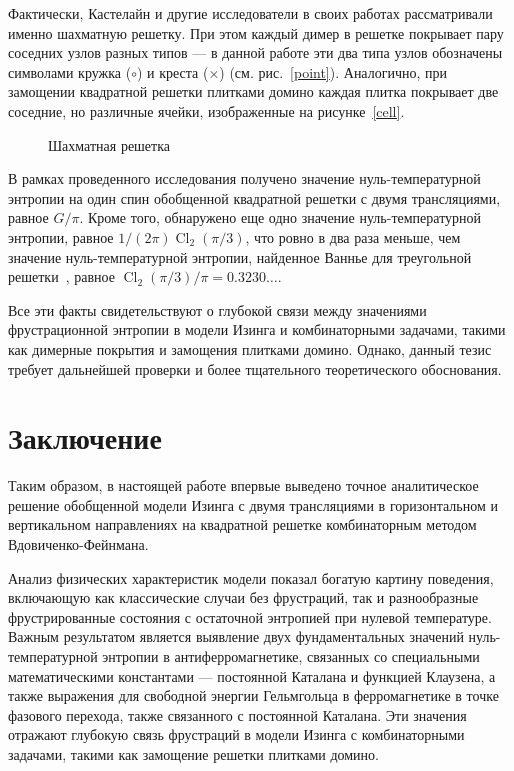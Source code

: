 \documentclass[utf8,12pt]{jetp}
\DeclareMathOperator{\Cl}{Cl}
\begin{document}
Фактически, Кастелайн и другие исследователи в своих работах рассматривали именно шахматную решетку. При этом каждый димер в решетке покрывает пару соседних узлов разных типов — в данной работе эти два типа узлов обозначены символами кружка ($\circ$) и креста ($\times$) (см. рис.~\ref{point}). Аналогично, при замощении квадратной решетки плитками домино каждая плитка покрывает две соседние, но различные ячейки, изображенные на рисунке~\ref{cell}.

\begin{figure}[h]
	\caption{Шахматная решетка}
	\label{chessLattice}
\end{figure}

В рамках проведенного исследования получено значение нуль-температурной энтропии на один спин обобщенной квадратной решетки с двумя трансляциями, равное $G/\pi$. Кроме того, обнаружено еще одно значение нуль-температурной энтропии, равное $1/(2\pi)\Cl_2(\pi/3)$, что ровно в два раза меньше, чем значение нуль-температурной энтропии, найденное Ваннье для треугольной решетки~\cite{wannier1950}, равное $\Cl_2(\pi/3)/\pi = 0.3230\dots$.

Все эти факты свидетельствуют о глубокой связи между значениями фрустрационной энтропии в модели Изинга и комбинаторными задачами, такими как димерные покрытия и замощения плитками домино. Однако, данный тезис требует дальнейшей проверки и более тщательного теоретического обоснования.

\section{Заключение}
		
Таким образом, в настоящей работе впервые выведено точное аналитическое решение обобщенной модели Изинга с двумя трансляциями в горизонтальном и вертикальном направлениях на квадратной решетке комбинаторным методом Вдовиченко-Фейнмана. 

Анализ физических характеристик модели показал богатую картину поведения, включающую как классические случаи без фрустраций, так и разнообразные фрустрированные состояния с остаточной энтропией при нулевой температуре. Важным результатом является выявление двух фундаментальных значений нуль-температурной энтропии в антиферромагнетике, связанных со специальными математическими константами — постоянной Каталана и функцией Клаузена, а также выражения для свободной энергии Гельмгольца в ферромагнетике в точке фазового перехода, также связанного с постоянной Каталана. Эти значения отражают глубокую связь фрустраций в модели Изинга с комбинаторными задачами, такими как замощение решетки плитками домино.
\end{document}
